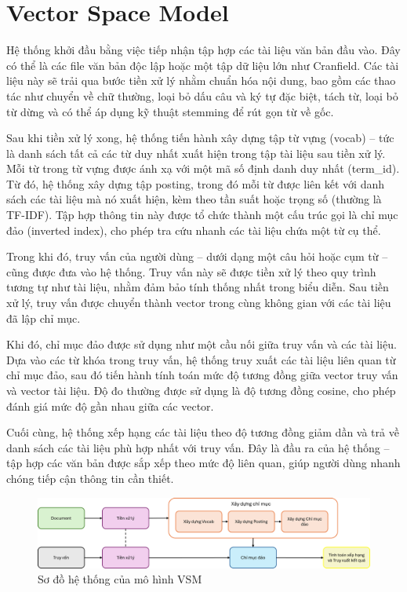 \section{Vector Space Model}
Hệ thống khởi đầu bằng việc tiếp nhận tập hợp các tài liệu văn bản đầu vào. Đây có thể là các file văn bản độc lập hoặc một tập dữ liệu lớn như Cranfield. Các tài liệu này sẽ trải qua bước tiền xử lý nhằm chuẩn hóa nội dung, bao gồm các thao tác như chuyển về chữ thường, loại bỏ dấu câu và ký tự đặc biệt, tách từ, loại bỏ từ dừng và có thể áp dụng kỹ thuật stemming để rút gọn từ về gốc.

Sau khi tiền xử lý xong, hệ thống tiến hành xây dựng tập từ vựng (vocab) -- tức là danh sách tất cả các từ duy nhất xuất hiện trong tập tài liệu sau tiền xử lý. Mỗi từ trong từ vựng được ánh xạ với một mã số định danh duy nhất (term\_id). Từ đó, hệ thống xây dựng tập posting, trong đó mỗi từ được liên kết với danh sách các tài liệu mà nó xuất hiện, kèm theo tần suất hoặc trọng số (thường là TF-IDF). Tập hợp thông tin này được tổ chức thành một cấu trúc gọi là chỉ mục đảo (inverted index), cho phép tra cứu nhanh các tài liệu chứa một từ cụ thể.

Trong khi đó, truy vấn của người dùng -- dưới dạng một câu hỏi hoặc cụm từ -- cũng được đưa vào hệ thống. Truy vấn này sẽ được tiền xử lý theo quy trình tương tự như tài liệu, nhằm đảm bảo tính thống nhất trong biểu diễn. Sau tiền xử lý, truy vấn được chuyển thành vector trong cùng không gian với các tài liệu đã lập chỉ mục.

Khi đó, chỉ mục đảo được sử dụng như một cầu nối giữa truy vấn và các tài liệu. Dựa vào các từ khóa trong truy vấn, hệ thống truy xuất các tài liệu liên quan từ chỉ mục đảo, sau đó tiến hành tính toán mức độ tương đồng giữa vector truy vấn và vector tài liệu. Độ đo thường được sử dụng là độ tương đồng cosine, cho phép đánh giá mức độ gần nhau giữa các vector.

Cuối cùng, hệ thống xếp hạng các tài liệu theo độ tương đồng giảm dần và trả về danh sách các tài liệu phù hợp nhất với truy vấn. Đây là đầu ra của hệ thống -- tập hợp các văn bản được sắp xếp theo mức độ liên quan, giúp người dùng nhanh chóng tiếp cận thông tin cần thiết.

\begin{figure}[H]
    \centering
    \caption{Sơ đồ hệ thống của mô hình VSM}
    \includegraphics[width=\linewidth]{assets/vsm-flowchart.png}
\end{figure}

